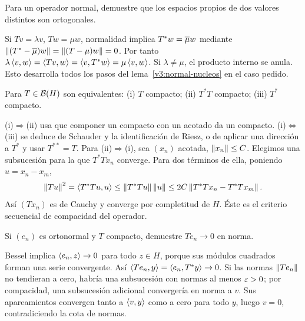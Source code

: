 \begin{ejercicio}\label{ej:v3-l11-2}
Para un operador normal, demuestre que los espacios propios de dos valores distintos son ortogonales.
\end{ejercicio}
\begin{solucion}
Si $Tv=\lambda v$, $Tw=\mu w$, normalidad implica $T^*w=\overline{\mu} w$ mediante $\left\lVert(T^*-\overline{\mu})w\right\rVert=\left\lVert(T-\mu)w\right\rVert=0$. Por tanto $\lambda\left\langle v,w\right\rangle=\left\langle Tv,w\right\rangle=\left\langle v,T^*w\right\rangle=\mu\left\langle v,w\right\rangle$. Si $\lambda\ne\mu$, el producto interno se anula. Esto desarrolla todos los pasos del lema~\ref{v3:normal-nucleos} en el caso pedido.
\end{solucion}

\begin{ejercicio}\label{ej:v3-l11-3}
Para $T\in\mathcal B(H)$ son equivalentes: (i) $T$ compacto; (ii) $T^*T$ compacto; (iii) $T^*$ compacto.
\end{ejercicio}
\begin{solucion}
(i)$\Rightarrow$(ii) usa que componer un compacto con un acotado da un compacto. (i)$\Leftrightarrow$(iii) se deduce de Schauder y la identificación de Riesz, o de aplicar una dirección a $T^*$ y usar $T^{**}=T$. Para (ii)$\Rightarrow$(i), sea $(x_n)$ acotada, $\left\lVert x_n\right\rVert\le C$. Elegimos una subsucesión para la que $T^*Tx_n$ converge. Para dos términos de ella, poniendo $u=x_n-x_m$,
\[\left\lVert Tu\right\rVert^2=\left\langle T^*Tu,u\right\rangle\le\left\lVert T^*Tu\right\rVert\left\lVert u\right\rVert\le2C\left\lVert T^*Tx_n-T^*Tx_m\right\rVert.
\]
Así $(Tx_n)$ es de Cauchy y converge por completitud de $H$. Éste es el criterio secuencial de compacidad del operador.
\end{solucion}

\begin{ejercicio}\label{ej:v3-l11-4}
Si $(e_n)$ es ortonormal y $T$ compacto, demuestre $Te_n\to0$ en norma.
\end{ejercicio}
\begin{solucion}
Bessel implica $\left\langle e_n,z\right\rangle\to0$ para todo $z\in H$, porque sus módulos cuadrados forman una serie convergente. Así $\left\langle Te_n,y\right\rangle=\left\langle e_n,T^*y\right\rangle\to0$. Si las normas $\left\lVert Te_n\right\rVert$ no tendieran a cero, habría una subsucesión con normas al menos $\varepsilon>0$; por compacidad, una subsucesión adicional convergería en norma a $v$. Sus apareamientos convergen tanto a $\left\langle v,y\right\rangle$ como a cero para todo $y$, luego $v=0$, contradiciendo la cota de normas.
\end{solucion}

